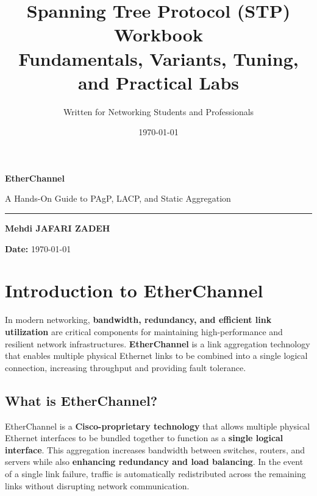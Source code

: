 \documentclass[a4paper]{article}
\title{\Huge \textbf{Spanning Tree Protocol (STP) Workbook}\\
       \Large Fundamentals, Variants, Tuning, and Practical Labs}
\author{\Large Written for Networking Students and Professionals}
\date{\today}
\begin{document}
\begin{titlepage}

    \centering
    \vspace*{4cm}
    {\Huge \textbf{EtherChannel}\par}
    \vspace{0.8cm}
    {\Large A Hands-On Guide to PAgP, LACP, and Static Aggregation\par}
    \vspace{0.3cm}
    \rule{0.9\textwidth}{1pt}
    
    \vspace{0.6cm}
    {\large \textbf{Mehdi JAFARI ZADEH}}\par
    \vspace{0.3cm}
	\centering
	\vspace*{4cm}

	\vfill
	\textbf{Date:} \today
	\vspace{2cm}
\end{titlepage}

\tableofcontents
\newpage
\section{Introduction to EtherChannel}
In modern networking, \textbf{bandwidth, redundancy, and efficient link utilization} are critical components for maintaining high-performance and resilient network infrastructures. \textbf{EtherChannel} is a link aggregation technology that enables multiple physical Ethernet links to be combined into a single logical connection, increasing throughput and providing fault tolerance.

\subsection{What is EtherChannel?}
EtherChannel is a \textbf{Cisco-proprietary technology} that allows multiple physical Ethernet interfaces to be bundled together to function as a \textbf{single logical interface}. This aggregation increases bandwidth between switches, routers, and servers while also \textbf{enhancing redundancy and load balancing}. In the event of a single link failure, traffic is automatically redistributed across the remaining links without disrupting network communication.
\end{document}
